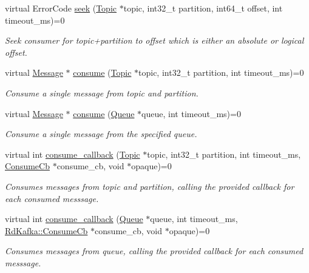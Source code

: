 \begin{DoxyCompactItemize}
virtual ErrorCode \hyperlink{classRdKafka_1_1Consumer_ac7917098034f6c653aadb497df6ae1de}{seek} (\hyperlink{classRdKafka_1_1Topic}{Topic} $\ast$topic, int32\_\-t partition, int64\_\-t offset, int timeout\_\-ms)=0
\begin{DoxyCompactList}\small\item\em Seek consumer for topic+partition to {\ttfamily offset} which is either an absolute or logical offset. \item\end{DoxyCompactList}\item 
virtual \hyperlink{classRdKafka_1_1Message}{Message} $\ast$ \hyperlink{classRdKafka_1_1Consumer_a0afd32e342283fc10fa6f32cc25950b7}{consume} (\hyperlink{classRdKafka_1_1Topic}{Topic} $\ast$topic, int32\_\-t partition, int timeout\_\-ms)=0
\begin{DoxyCompactList}\small\item\em Consume a single message from {\ttfamily topic} and {\ttfamily partition}. \item\end{DoxyCompactList}\item 
virtual \hyperlink{classRdKafka_1_1Message}{Message} $\ast$ \hyperlink{classRdKafka_1_1Consumer_a2393e5cc720f1e08231037af9e4b6ac5}{consume} (\hyperlink{classRdKafka_1_1Queue}{Queue} $\ast$queue, int timeout\_\-ms)=0
\begin{DoxyCompactList}\small\item\em Consume a single message from the specified queue. \item\end{DoxyCompactList}\item 
virtual int \hyperlink{classRdKafka_1_1Consumer_a15a3e64a1ed777804df8b4ea02a40887}{consume\_\-callback} (\hyperlink{classRdKafka_1_1Topic}{Topic} $\ast$topic, int32\_\-t partition, int timeout\_\-ms, \hyperlink{classRdKafka_1_1ConsumeCb}{ConsumeCb} $\ast$consume\_\-cb, void $\ast$opaque)=0
\begin{DoxyCompactList}\small\item\em Consumes messages from {\ttfamily topic} and {\ttfamily partition}, calling the provided callback for each consumed messsage. \item\end{DoxyCompactList}\item 
virtual int \hyperlink{classRdKafka_1_1Consumer_a992d17b68c36e500cfa7332c23d112ba}{consume\_\-callback} (\hyperlink{classRdKafka_1_1Queue}{Queue} $\ast$queue, int timeout\_\-ms, \hyperlink{classRdKafka_1_1ConsumeCb}{RdKafka::ConsumeCb} $\ast$consume\_\-cb, void $\ast$opaque)=0
\begin{DoxyCompactList}\small\item\em Consumes messages from {\ttfamily queue}, calling the provided callback for each consumed messsage. \item\end{DoxyCompactList}\end{DoxyCompactItemize}
